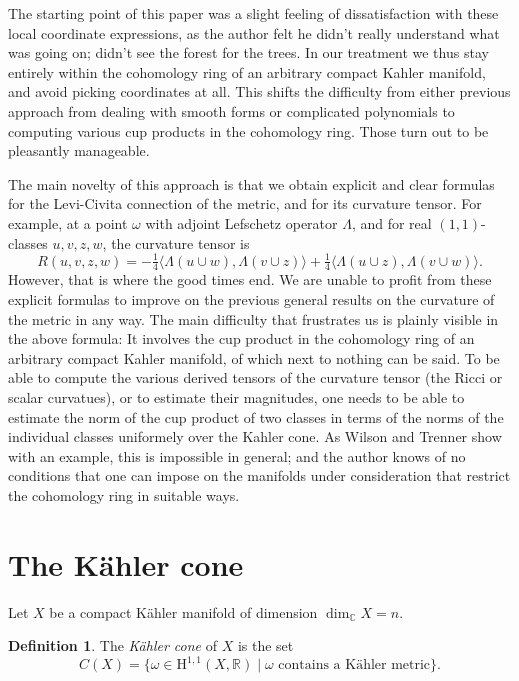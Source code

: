 \documentclass[11pt,a4paper]{amsart}
\theoremstyle{definition}
\newtheorem*{defi}{Definition}
\theoremstyle{remark}
\newcommand{\RR}{\mathbb{R}}
\newcommand{\CC}{\mathbb{C}}
\def\onfo{\tfrac14}
\def\coho#1{\mathrm{H}^{#1}}
\def\kf{\omega}
\def\Lef{\Lambda}
\def\ton{u}
\def\ttw{v}
\def\tth{z}
\def\tfo{w}
\begin{document}
The starting point of this paper was a slight feeling of dissatisfaction with
these local coordinate expressions, as the author felt he didn't really
understand what was going on; didn't see the forest for the trees. In our
treatment we thus stay entirely within the cohomology ring of an arbitrary
compact Kahler manifold, and avoid picking coordinates at all. This shifts the
difficulty from either previous approach from dealing with smooth forms or
complicated polynomials to computing various cup products in the cohomology
ring. Those turn out to be pleasantly manageable. 

The main novelty of this approach is that we obtain explicit and clear formulas
for the Levi-Civita connection of the metric, and for its curvature tensor. For
example, at a point $\kf$ with adjoint Lefschetz operator $\Lambda$, and for
real $(1,1)$-classes $\ton, \ttw, \tth, \tfo$, the curvature tensor is
$$
R(\ton,\ttw,\tth,\tfo)
=
- \onfo \langle \Lef(\ton \cup \tfo), \Lef(\ttw \cup \tth) \rangle
+ \onfo \langle \Lef(\ton \cup \tth), \Lef(\ttw \cup \tfo) \rangle.
$$
However, that is where the good times end. We are unable to profit from these
explicit formulas to improve on the previous general results on the curvature of
the metric in any way. The main difficulty that frustrates us is plainly visible
in the above formula: It involves the cup product in the cohomology ring of an
arbitrary compact Kahler manifold, of which next to nothing can be said. To be
able to compute the various derived tensors of the curvature tensor (the Ricci
or scalar curvatues), or to estimate their magnitudes, one needs to be able to
estimate the norm of the cup product of two classes in terms of the norms of the
individual classes uniformely over the Kahler cone. As Wilson and Trenner show
with an example, this is impossible in general; and the author knows of no
conditions that one can impose on the manifolds under consideration that
restrict the cohomology ring in suitable ways.



\section{The K\"{a}hler cone}

Let $X$ be a compact K\"{a}hler manifold of dimension $\dim_{\CC} X = n$.

\begin{defi}
The \emph{K\"{a}hler cone} of $X$ is the set
\begin{equation*}
C(X) = \{ \kf \in \coho{1,1}(X,\RR) 
\mid
\text{$\kf$ contains a K\"{a}hler metric}
\}.
\end{equation*}
\end{defi}
\end{document}
